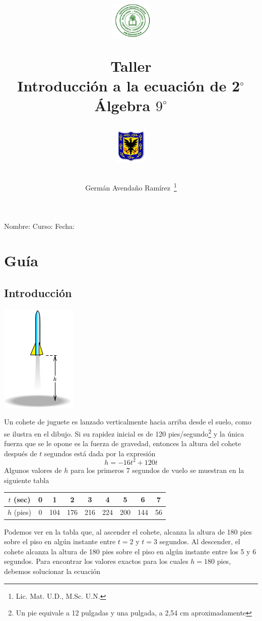 \documentclass[letterpaper,11pt,twoside]{article}
\author{Germ\'an Avenda\~no Ram\'irez~\thanks{Lic. Mat. U.D., M.Sc. U.N.}}
\title{\begin{minipage}{.2\textwidth}
\includegraphics[height=1.75cm]{Images/logo-colegio.png}\end{minipage}
\begin{minipage}{.55\textwidth}
\begin{center}
Taller\\
Introducción a la ecuación de 2$^{\circ}$\\
Álgebra $9^{\circ}$
\end{center}
\end{minipage}\hfill
\begin{minipage}{.2\textwidth}
\includegraphics[height=1.75cm]{Images/logo-sed.png} 
\end{minipage}}
\date{}
\begin{document}
\maketitle
Nombre: \hrulefill Curso: \underline{\hspace*{44pt}} Fecha: \underline{\hspace*{2.5cm}}
\section*{Guía}
\subsection*{Introducción}
\begin{minipage}{.35\textwidth}
\begin{center}
\includegraphics[scale=.8]{Images/Pantallazo-05.png}
\end{center}
\end{minipage}
\begin{minipage}{.6\textwidth}
Un cohete de juguete es lanzado verticalmente hacia arriba desde el suelo, como se ilustra en el dibujo. 
Si su rapidez inicial es de 120 pies/segundo\footnote{Un pie equivale a 12 pulgadas y una pulgada, a 2,54 cm aproximadamente} y la única fuerza que se le opone es la fuerza de gravedad, entonces la altura del cohete después de $t$ segundos está dada por la expresión
\[h=-16t^{2}+120t\]
Algunos valores de $h$ para los primeros 7 segundos de vuelo se muestran en la siguiente tabla
\end{minipage}
\begin{center}
 \begin{tabular}{|c|cccccccc|}
 \hline 
 $t$ (sec) & 0 & 1 & 2 & 3 & 4 & 5 & 6 & 7 \\ 
 \hline 
$h$ (pies) & 0 & 104 & 176 & 216 & 224 & 200 & 144 & 56 \\ 
 \hline 
 \end{tabular} 
 \end{center} 
 Podemos ver en la tabla que, al ascender el cohete, alcanza la altura de 180 pies sobre el piso en algún instante entre $t=2$ y $t=3$ segundos. Al descender, el cohete alcanza la altura de 180 pies sobre el piso en algún instante entre los 5 y 6 segundos. Para encontrar los valores exactos para los cuales $h=180$ pies, debemos solucionar la ecuación
\end{document}
